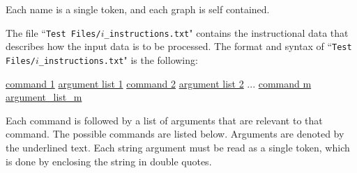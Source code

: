 \documentclass{article}
\begin{document}
Each name is a single token, and each graph is self contained.

The file ``\texttt{Test Files/\(i\)\_instructions.txt}" contains the instructional data that describes how the input data is to be processed. The format and syntax of ``\texttt{Test Files/\(i\)\_instructions.txt}" is the following: 

\vspace{5mm}
\begin{framed}
\begin{algorithmic}
\STATE \underline{command 1} \underline{argument list 1}
\STATE
\STATE \underline{command 2} \underline{argument list 2}
\STATE
\STATE ... 
\STATE
\STATE \underline{command m} \underline{argument\_list\_m}
\end{algorithmic}
\end{framed}
\vspace{5mm}

Each command is followed by a list of arguments that are relevant to that command. The possible commands are listed below. Arguments are denoted by the underlined text. Each string argument must be read as a single token, which is done by enclosing the string in double quotes.
\end{document}
